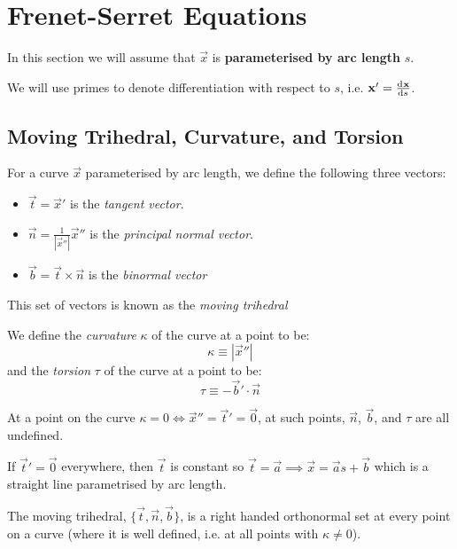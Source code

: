 \documentclass[../main.tex]{subfiles}
\begin{document}
\section{Frenet-Serret Equations}
\begin{remark}[Parameterisation]
  In this section we will assume that $\vec{x}$ is \textbf{parameterised by arc length} $s$.

  We will use primes to denote differentiation with respect to $s$, i.e. $\vec{x}' = \deriv{\vec{x}}{s}$.
\end{remark}
\subsection{Moving Trihedral, Curvature, and Torsion}
\begin{definition}
  For a curve $\vec{x}$ parameterised by arc length, we define the following three vectors:
  \label{movingTrihedral}
  \begin{itemize}
    \item $\vec{t} = \vec{x}'$ is the \textit{tangent vector}.
    \item $\vec{n} = \frac{1}{|\vec{x}''|}\vec{x}''$ is the \textit{principal normal vector}.
    \item $\vec{b} = \vec{t} \times \vec{n}$ is the \textit{binormal vector}
  \end{itemize}
  This set of vectors is known as the \textit{moving trihedral}
\end{definition}
\begin{definition}
  We define the \textit{curvature} $\kappa$ of the curve at a point to be:
  \[
    \kappa \equiv |\vec{x}''|
  \]
  and the \textit{torsion} $\tau$ of the curve at a point to be:
  \[
    \tau \equiv -\vec{b}' \cdot \vec{n}
  \]
\end{definition}
\begin{remark}
  At a point on the curve $\kappa = 0 \iff \vec{x}'' = \vec{t}' = \vec{0}$, at such points, $\vec{n}$, $\vec{b}$, and $\tau$ are all undefined.

  If $\vec{t}' = \vec{0}$ everywhere, then $\vec{t}$ is constant so $\vec{t} = \vec{a} \implies \vec{x} = \vec{a}s + \vec{b}$ which is a straight line parametrised by arc length.
\end{remark}
\begin{proposition}
  The moving trihedral, $\{\vec{t}, \vec{n}, \vec{b}\}$, is a right handed orthonormal set at every point on a curve (where it is well defined, i.e. at all points with $\kappa \neq 0$).
  \label{trihedralOrthonormal}
\end{proposition}
\end{document}
